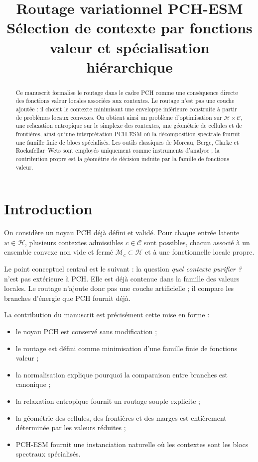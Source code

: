 \documentclass[11pt,a4paper]{article}
\title{Routage variationnel PCH-ESM\\
\large Sélection de contexte par fonctions valeur et spécialisation hiérarchique}
\author{}
\date{}
\newcommand{\Hh}{\mathcal H}
\newcommand{\Mcal}{\mathcal M}
\newcommand{\Ccal}{\mathcal C}
\begin{document}
\maketitle

\begin{abstract}
Ce manuscrit formalise le routage dans le cadre PCH comme une conséquence directe des fonctions valeur locales associées aux contextes. Le routage n'est pas une couche ajoutée : il choisit le contexte minimisant une enveloppe inférieure construite à partir de problèmes locaux convexes. On obtient ainsi un problème d'optimisation sur \(\Hh\times\Ccal\), une relaxation entropique sur le simplexe des contextes, une géométrie de cellules et de frontières, ainsi qu'une interprétation PCH-ESM où la décomposition spectrale fournit une famille finie de blocs spécialisés. Les outils classiques de Moreau, Berge, Clarke et Rockafellar--Wets sont employés uniquement comme instruments d'analyse ; la contribution propre est la géométrie de décision induite par la famille de fonctions valeur.
\end{abstract}

\tableofcontents

\section{Introduction}

On considère un noyau PCH déjà défini et validé. Pour chaque entrée latente \(w\in\Hh\), plusieurs contextes admissibles \(c\in\Ccal\) sont possibles, chacun associé à un ensemble convexe non vide et fermé \(\Mcal_c\subset\Hh\) et à une fonctionnelle locale propre.

Le point conceptuel central est le suivant : la question \emph{quel contexte purifier ?} n'est pas extérieure à PCH. Elle est déjà contenue dans la famille des valeurs locales. Le routage n'ajoute donc pas une couche artificielle ; il compare les branches d'énergie que PCH fournit déjà.

La contribution du manuscrit est précisément cette mise en forme :
\begin{itemize}[leftmargin=2em]
    \item le noyau PCH est conservé sans modification ;
    \item le routage est défini comme minimisation d'une famille finie de fonctions valeur ;
    \item la normalisation explique pourquoi la comparaison entre branches est canonique ;
    \item la relaxation entropique fournit un routage souple explicite ;
    \item la géométrie des cellules, des frontières et des marges est entièrement déterminée par les valeurs réduites ;
    \item PCH-ESM fournit une instanciation naturelle où les contextes sont les blocs spectraux spécialisés.
\end{itemize}
\end{document}
